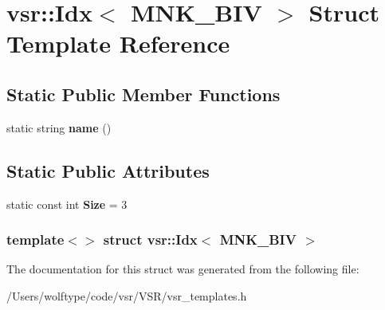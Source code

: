 \hypertarget{structvsr_1_1_idx_3_01_m_n_k___b_i_v_01_4}{\section{vsr\-:\-:Idx$<$ M\-N\-K\-\_\-\-B\-I\-V $>$ Struct Template Reference}
\label{structvsr_1_1_idx_3_01_m_n_k___b_i_v_01_4}
}
\subsection*{Static Public Member Functions}
\begin{DoxyCompactItemize}
\item 
\hypertarget{structvsr_1_1_idx_3_01_m_n_k___b_i_v_01_4_a37aefe21bbf28278c28ad5dd7b45ae09}{static string {\bfseries name} ()}\label{structvsr_1_1_idx_3_01_m_n_k___b_i_v_01_4_a37aefe21bbf28278c28ad5dd7b45ae09}

\end{DoxyCompactItemize}
\subsection*{Static Public Attributes}
\begin{DoxyCompactItemize}
\item 
\hypertarget{structvsr_1_1_idx_3_01_m_n_k___b_i_v_01_4_ab386c7ca5e2f991583ed77237e96d299}{static const int {\bfseries Size} = 3}\label{structvsr_1_1_idx_3_01_m_n_k___b_i_v_01_4_ab386c7ca5e2f991583ed77237e96d299}

\end{DoxyCompactItemize}
\subsubsection*{template$<$$>$ struct vsr\-::\-Idx$<$ M\-N\-K\-\_\-\-B\-I\-V $>$}



The documentation for this struct was generated from the following file\-:\begin{DoxyCompactItemize}
\item 
/\-Users/wolftype/code/vsr/\-V\-S\-R/vsr\-\_\-templates.\-h\end{DoxyCompactItemize}
